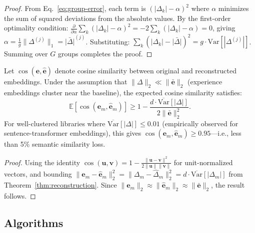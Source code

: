 \begin{proof}
From Eq.~\eqref{eq:group-error}, each term is $(|\Delta_k| - \alpha)^2$ where
$\alpha$ minimizes the sum of squared deviations from the absolute values.
By the first-order optimality condition:
$\frac{\partial}{\partial \alpha} \sum_k (|\Delta_k| - \alpha)^2 = -2\sum_k(|\Delta_k| - \alpha) = 0$,
giving $\alpha = \frac{1}{g}\|\Delta^{(j)}\|_1 = \bar{|\Delta|}^{(j)}$.
Substituting: $\sum_k (|\Delta_k| - \bar{|\Delta|})^2 = g \cdot \mathrm{Var}[|\Delta^{(j)}|]$.
Summing over $G$ groups completes the proof.
\end{proof}

\begin{corollary}
\label{cor:cosine}
Let $\cos(\bm{e}, \hat{\bm{e}})$ denote cosine similarity between original
and reconstructed embeddings. Under the assumption that $\|\Delta\|_2 \ll
\|\bar{\bm{e}}\|_2$ (experience embeddings cluster near the baseline), the
expected cosine similarity satisfies:
\begin{equation}
    \mathbb{E}\left[\cos(\bm{e}_m, \hat{\bm{e}}_m)\right]
    \geq 1 - \frac{d \cdot \overline{\mathrm{Var}}[|\Delta|]}{2\|\bar{\bm{e}}\|_2^2}.
\end{equation}
For well-clustered libraries where $\overline{\mathrm{Var}}[|\Delta|] \leq 0.01$
(empirically observed for sentence-transformer embeddings), this gives
$\cos(\bm{e}_m, \hat{\bm{e}}_m) \geq 0.95$---i.e., less than 5\% semantic
similarity loss.
\end{corollary}

\begin{proof}
Using the identity $\cos(\bm{u}, \bm{v}) = 1 - \frac{\|\bm{u} - \bm{v}\|^2}{2\|\bm{u}\|\|\bm{v}\|}$
for unit-normalized vectors, and bounding $\|\bm{e}_m - \hat{\bm{e}}_m\|_2^2 =
\|\Delta_m - \hat{\Delta}_m\|_2^2 = d \cdot \overline{\mathrm{Var}}[|\Delta_m|]$
from Theorem~\ref{thm:reconstruction}. Since $\|\bm{e}_m\|_2 \approx
\|\hat{\bm{e}}_m\|_2 \approx \|\bar{\bm{e}}\|_2$, the result follows.
\end{proof}

\subsection{Algorithms}

